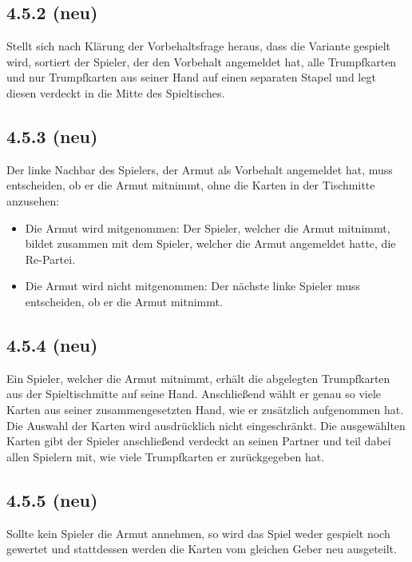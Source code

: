 \subsection*{4.5.2 (neu)}

Stellt sich nach Klärung der Vorbehaltsfrage heraus, dass die Variante
 gespielt wird, sortiert der Spieler, der den Vorbehalt
angemeldet hat, alle Trumpfkarten und nur Trumpfkarten aus seiner Hand
auf einen separaten Stapel und legt diesen verdeckt in die Mitte des
Spieltisches.

\subsection*{4.5.3 (neu)}

Der linke Nachbar des Spielers, der Armut als Vorbehalt angemeldet hat,
muss entscheiden, ob er die Armut mitnimmt, ohne die Karten in der
Tischmitte anzusehen:

\begin{itemize}
    \item Die Armut wird mitgenommen: Der Spieler, welcher die Armut
        mitnimmt, bildet zusammen mit dem Spieler, welcher die Armut
        angemeldet hatte, die Re-Partei.
    \item Die Armut wird nicht mitgenommen: Der nächste linke Spieler
        muss entscheiden, ob er die Armut mitnimmt.
\end{itemize}

\subsection*{4.5.4 (neu)}

Ein Spieler, welcher die Armut mitnimmt, erhält die abgelegten
Trumpfkarten aus der Spieltischmitte auf seine Hand. Anschließend
wählt er genau so viele Karten aus seiner zusammengesetzten Hand, wie
er zusätzlich aufgenommen hat. Die Auswahl der Karten wird
ausdrücklich nicht eingeschränkt. Die ausgewählten Karten gibt der
Spieler anschließend verdeckt an seinen Partner und teil dabei allen
Spielern mit, wie viele Trumpfkarten er zurückgegeben hat.

\subsection*{4.5.5 (neu)}

Sollte kein Spieler die Armut annehmen, so wird das Spiel weder gespielt
noch gewertet und stattdessen werden die Karten vom gleichen Geber neu
ausgeteilt.


